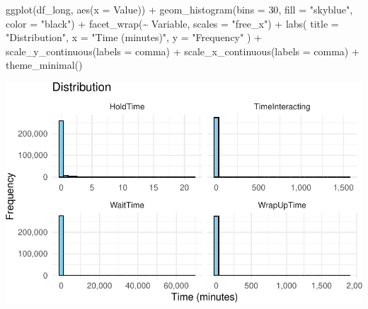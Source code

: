 \documentclass[
  letterpaper,
  DIV=11,
  numbers=noendperiod]{scrartcl}
\newenvironment{Shaded}{\begin{snugshade}}{\end{snugshade}}
\newcommand{\AttributeTok}[1]{\textcolor[rgb]{0.40,0.45,0.13}{#1}}
\newcommand{\DecValTok}[1]{\textcolor[rgb]{0.68,0.00,0.00}{#1}}
\newcommand{\FunctionTok}[1]{\textcolor[rgb]{0.28,0.35,0.67}{#1}}
\newcommand{\NormalTok}[1]{\textcolor[rgb]{0.00,0.23,0.31}{#1}}
\newcommand{\SpecialCharTok}[1]{\textcolor[rgb]{0.37,0.37,0.37}{#1}}
\newcommand{\StringTok}[1]{\textcolor[rgb]{0.13,0.47,0.30}{#1}}
\begin{document}
\begin{Shaded}
\begin{Highlighting}[]
\FunctionTok{ggplot}\NormalTok{(df\_long, }\FunctionTok{aes}\NormalTok{(}\AttributeTok{x =}\NormalTok{ Value)) }\SpecialCharTok{+}
  \FunctionTok{geom\_histogram}\NormalTok{(}\AttributeTok{bins =} \DecValTok{30}\NormalTok{, }\AttributeTok{fill =} \StringTok{"skyblue"}\NormalTok{, }\AttributeTok{color =} \StringTok{"black"}\NormalTok{) }\SpecialCharTok{+}
  \FunctionTok{facet\_wrap}\NormalTok{(}\SpecialCharTok{\textasciitilde{}}\NormalTok{ Variable, }\AttributeTok{scales =} \StringTok{"free\_x"}\NormalTok{) }\SpecialCharTok{+} 
  \FunctionTok{labs}\NormalTok{(}
    \AttributeTok{title =} \StringTok{"Distribution"}\NormalTok{,}
    \AttributeTok{x =} \StringTok{"Time (minutes)"}\NormalTok{, }
    \AttributeTok{y =} \StringTok{"Frequency"}
\NormalTok{  ) }\SpecialCharTok{+}
  \FunctionTok{scale\_y\_continuous}\NormalTok{(}\AttributeTok{labels =}\NormalTok{ comma) }\SpecialCharTok{+} 
  \FunctionTok{scale\_x\_continuous}\NormalTok{(}\AttributeTok{labels =}\NormalTok{ comma) }\SpecialCharTok{+} 
  \FunctionTok{theme\_minimal}\NormalTok{()}
\end{Highlighting}
\end{Shaded}

\includegraphics{final_proj_group1_files/figure-pdf/boxplot_contvar-2.pdf}
\end{document}
